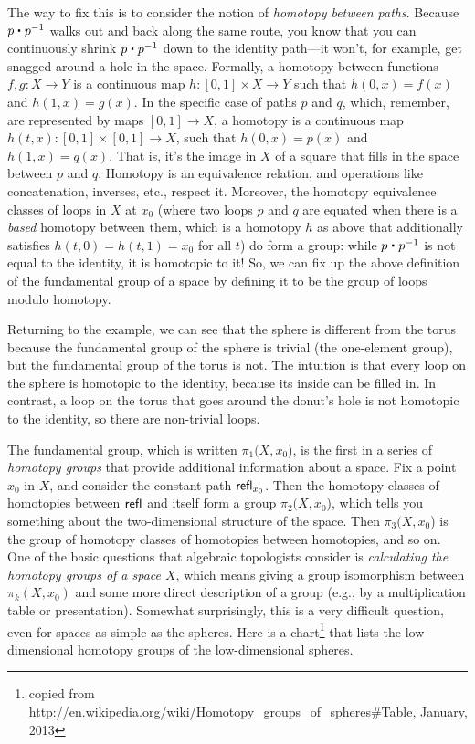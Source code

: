 The way to fix this is to consider the notion of \emph{homotopy between
paths}. Because $p \ct \opp p$ walks out and back along the same route, you know
that you can continuously shrink $p \ct \opp p$ down to the identity path---it
won't, for example, get snagged around a hole in the space.  Formally, a
homotopy between functions $f, g : X \rightarrow Y$ is a continuous map 
$h : [0,1] \times X \rightarrow Y$ such that $h(0,x) = f(x)$ and $h(1,x) = g(x)$.  In the specific case
of paths $p$ and $q$, which, remember, are represented by maps $[0,1] \rightarrow X$, a
homotopy is a continuous map $h(t,x) : [0,1] \times [0,1] \rightarrow X$, such that
$h(0,x) = p(x)$ and $h(1,x) = q(x)$.  That is, it's the image in $X$ of a
square that fills in the space between $p$ and $q$.  Homotopy is an
equivalence relation, and operations like concatenation, inverses,
etc., respect it.  Moreover, the homotopy equivalence classes of loops in
$X$ at $x_0$ (where two loops $p$ and $q$ are equated when there is a \emph{based}
homotopy between them, which is a homotopy $h$ as above that additionally
satisfies $h(t,0) = h(t,1) = x_0$ for all $t$) do form a group: while $p \ct \opp p$
is not equal to the identity, it is homotopic to it!  So, we can fix up
the above definition of the fundamental group of a space by defining it
to be the group of loops modulo homotopy.

Returning to the example, we can see that the sphere is different from
the torus because the fundamental group of the sphere is trivial (the
one-element group), but the fundamental group of the torus is not.  The
intuition is that every loop on the sphere is homotopic to the identity,
because its inside can be filled in.  In contrast, a loop on the torus that
goes around the donut's hole is not homotopic to the identity, so there
are non-trivial loops.

The fundamental group, which is written $\pi_1(X,x_0$), is the first in
a series of \emph{homotopy groups} that provide additional information
about a space.  Fix a point $x_0$ in $X$, and consider the constant path
$\mathsf{refl}_{x_0}$.  Then the homotopy classes of homotopies between $\mathsf{refl}_{}$ and itself form a
group $\pi_2(X,x_0$), which tells you
something about the two-dimensional structure of the space.  Then
$\pi_3(X,x_0$) is the group of homotopy classes of homotopies between homotopies, and so on.
One of the basic questions that algebraic topologists consider is
\emph{calculating the homotopy groups of a space $X$}, which means
giving a group isomorphism between $\pi_k(X,x_0)$ and some more direct
description of a group (e.g., by a multiplication table or
presentation).  Somewhat surprisingly, this is a very difficult
question, even for spaces as simple as the spheres.  Here is a chart\footnote{copied
from \url{http://en.wikipedia.org/wiki/Homotopy_groups_of_spheres\#Table}, January, 2013}
that lists the low-dimensional homotopy groups of the low-dimensional
spheres.

